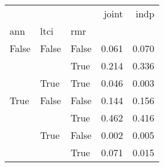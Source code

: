 \begin{tabular}{lllrr}
\toprule
      &       &       &  joint &   indp \\
ann & ltci & rmr &        &        \\
\midrule
False & False & False &  0.061 &  0.070 \\
      &       & True  &  0.214 &  0.336 \\
      & True  & True  &  0.046 &  0.003 \\
True  & False & False &  0.144 &  0.156 \\
      &       & True  &  0.462 &  0.416 \\
      & True  & False &  0.002 &  0.005 \\
      &       & True  &  0.071 &  0.015 \\
\bottomrule
\end{tabular}
